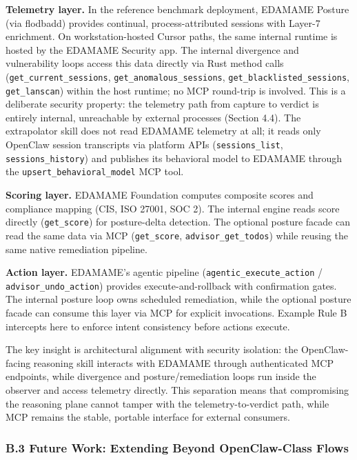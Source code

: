 \documentclass[
]{article}
\begin{document}
\textbf{Telemetry layer.} In the reference benchmark deployment, EDAMAME
Posture (via flodbadd) provides continual, process-attributed sessions
with Layer-7 enrichment. On workstation-hosted Cursor paths, the same
internal runtime is hosted by the EDAMAME Security app. The internal
divergence and vulnerability loops access this data directly via Rust
method calls (\texttt{get\_current\_sessions},
\texttt{get\_anomalous\_sessions}, \texttt{get\_blacklisted\_sessions},
\texttt{get\_lanscan}) within the host runtime; no MCP round-trip is
involved. This is a deliberate security property: the telemetry path
from capture to verdict is entirely internal, unreachable by external
processes (Section 4.4). The extrapolator skill does not read EDAMAME
telemetry at all; it reads only OpenClaw session transcripts via
platform APIs (\texttt{sessions\_list}, \texttt{sessions\_history}) and
publishes its behavioral model to EDAMAME through the
\texttt{upsert\_behavioral\_model} MCP tool.

\textbf{Scoring layer.} EDAMAME Foundation computes composite scores and
compliance mapping (CIS, ISO 27001, SOC 2). The internal engine reads
score directly (\texttt{get\_score}) for posture-delta detection. The
optional posture facade can read the same data via MCP
(\texttt{get\_score}, \texttt{advisor\_get\_todos}) while reusing the
same native remediation pipeline.

\textbf{Action layer.} EDAMAME's agentic pipeline
(\texttt{agentic\_execute\_action} / \texttt{advisor\_undo\_action})
provides execute-and-rollback with confirmation gates. The internal
posture loop owns scheduled remediation, while the optional posture
facade can consume this layer via MCP for explicit invocations. Example
Rule B intercepts here to enforce intent consistency before actions
execute.

The key insight is architectural alignment with security isolation: the
OpenClaw-facing reasoning skill interacts with EDAMAME through
authenticated MCP endpoints, while divergence and posture/remediation
loops run inside the observer and access telemetry directly. This
separation means that compromising the reasoning plane cannot tamper
with the telemetry-to-verdict path, while MCP remains the stable,
portable interface for external consumers.

\subsubsection{B.3 Future Work: Extending Beyond OpenClaw-Class
Flows}\label{b.3-future-work-extending-beyond-openclaw-class-flows}
\end{document}
